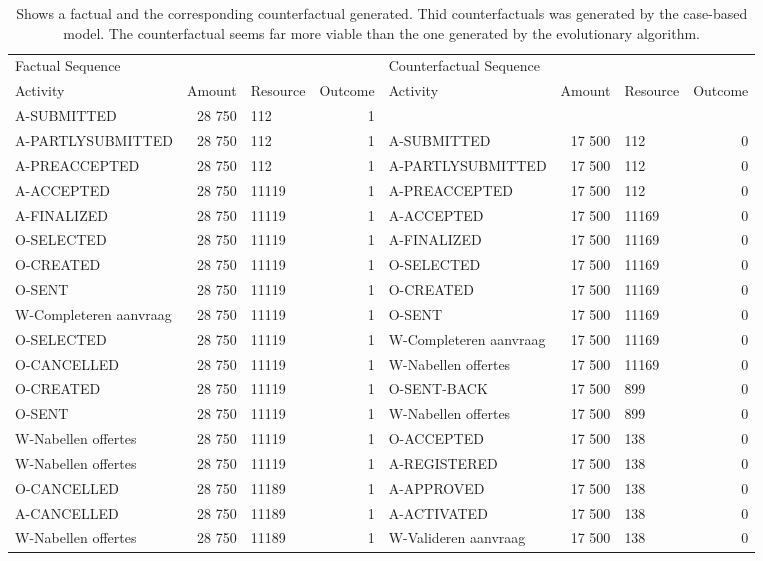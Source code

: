 \begin{table}
\caption{Shows a factual and the corresponding counterfactual generated. Thid counterfactuals was generated by the case-based model. The counterfactual seems far more viable than the one generated by the evolutionary algorithm.}
\label{tbl:example-cf-cbg}
\begin{tabular}{lrlrlrlr}
\toprule
\multicolumn{4}{l}{Factual Sequence} & \multicolumn{4}{l}{Counterfactual Sequence} \\
Activity & Amount & Resource & Outcome & Activity & Amount & Resource & Outcome \\
\midrule
A-SUBMITTED & 28 750 & 112 & 1 &  &  &  &  \\
A-PARTLYSUBMITTED & 28 750 & 112 & 1 & A-SUBMITTED & 17 500 & 112 & 0 \\
A-PREACCEPTED & 28 750 & 112 & 1 & A-PARTLYSUBMITTED & 17 500 & 112 & 0 \\
A-ACCEPTED & 28 750 & 11119 & 1 & A-PREACCEPTED & 17 500 & 112 & 0 \\
A-FINALIZED & 28 750 & 11119 & 1 & A-ACCEPTED & 17 500 & 11169 & 0 \\
O-SELECTED & 28 750 & 11119 & 1 & A-FINALIZED & 17 500 & 11169 & 0 \\
O-CREATED & 28 750 & 11119 & 1 & O-SELECTED & 17 500 & 11169 & 0 \\
O-SENT & 28 750 & 11119 & 1 & O-CREATED & 17 500 & 11169 & 0 \\
W-Completeren aanvraag & 28 750 & 11119 & 1 & O-SENT & 17 500 & 11169 & 0 \\
O-SELECTED & 28 750 & 11119 & 1 & W-Completeren aanvraag & 17 500 & 11169 & 0 \\
O-CANCELLED & 28 750 & 11119 & 1 & W-Nabellen offertes & 17 500 & 11169 & 0 \\
O-CREATED & 28 750 & 11119 & 1 & O-SENT-BACK & 17 500 & 899 & 0 \\
O-SENT & 28 750 & 11119 & 1 & W-Nabellen offertes & 17 500 & 899 & 0 \\
W-Nabellen offertes & 28 750 & 11119 & 1 & O-ACCEPTED & 17 500 & 138 & 0 \\
W-Nabellen offertes & 28 750 & 11119 & 1 & A-REGISTERED & 17 500 & 138 & 0 \\
O-CANCELLED & 28 750 & 11189 & 1 & A-APPROVED & 17 500 & 138 & 0 \\
A-CANCELLED & 28 750 & 11189 & 1 & A-ACTIVATED & 17 500 & 138 & 0 \\
W-Nabellen offertes & 28 750 & 11189 & 1 & W-Valideren aanvraag & 17 500 & 138 & 0 \\
\bottomrule
\end{tabular}
\end{table}
